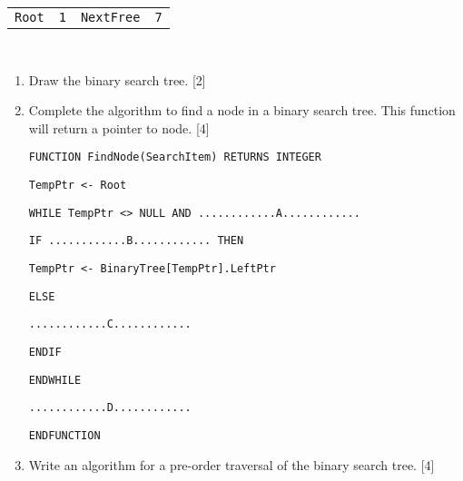 \noindent \begin{center}
\texttt{}%
\begin{tabular}{c|c|c|c|}
\cline{2-2} \cline{4-4} 
\texttt{Root} & \texttt{1} & \texttt{NextFree} & \texttt{7}\tabularnewline
\cline{2-2} \cline{4-4} 
\end{tabular}\texttt{ }
\par\end{center}
\begin{enumerate}
\item Draw the binary search tree. \hfill{}{[}2{]}
\item Complete the algorithm to find a node in a binary search tree. This
function will return a pointer to node.\hfill{} {[}4{]}

\noindent %
\noindent\begin{minipage}[t]{1\columnwidth}%
\texttt{FUNCTION FindNode(SearchItem) RETURNS INTEGER }

\texttt{\qquad{}TempPtr <- Root }

\texttt{\qquad{}WHILE TempPtr <> NULL AND ............A............}

\texttt{\qquad{}\qquad{}IF ............B............ THEN }

\texttt{\qquad{}\qquad{}\qquad{}TempPtr <- BinaryTree{[}TempPtr{]}.LeftPtr }

\texttt{\qquad{}\qquad{}ELSE }

\texttt{\qquad{}\qquad{}\qquad{}............C............ }

\texttt{\qquad{}\qquad{}ENDIF }

\texttt{\qquad{}ENDWHILE }

\texttt{\qquad{}............D............}

\texttt{ENDFUNCTION} %
\end{minipage}
\item Write an algorithm for a pre-order traversal of the binary search
tree. \hfill{}{[}4{]}
\end{enumerate}